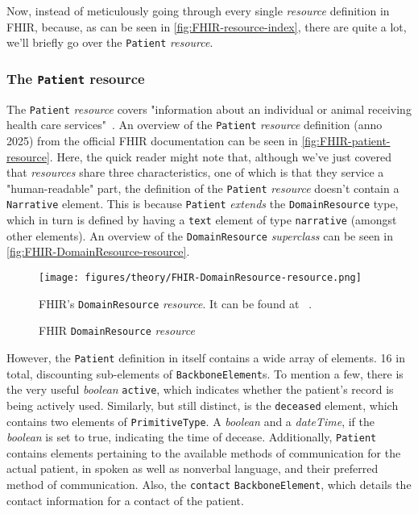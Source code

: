 \noindent
Now, instead of meticulously going through every single \emph{resource} definition in FHIR, because, as can be seen in \autoref{fig:FHIR-resource-index}, there are quite a lot, we'll briefly go over the \texttt{Patient} \emph{resource}.

\subsubsection*{The \texttt{Patient} resource}
The \texttt{Patient} \emph{resource} covers "information about an individual or animal receiving health care services"~\cite{FHIR-patient-resource}. An overview of the \texttt{Patient} \emph{resource} definition (anno 2025) from the official FHIR documentation can be seen in \autoref{fig:FHIR-patient-resource}. Here, the quick reader might note that, although we've just covered that \emph{resources} share three characteristics, one of which is that they service a "human-readable" part, the definition of the \texttt{Patient} \emph{resource} doesn't contain a \texttt{Narrative} element. This is because \texttt{Patient} \emph{extends} the \texttt{DomainResource} type, which in turn is defined by having a \texttt{text} element of type \texttt{narrative} (amongst other elements). An overview of the \texttt{DomainResource} \emph{superclass} can be seen in \autoref{fig:FHIR-DomainResource-resource}.

\begin{figure}[H]
    \centering
    \texttt{[image: figures/theory/FHIR-DomainResource-resource.png]}
    \caption{FHIR \texttt{DomainResource} \emph{resource}}
    \medskip
    \small
    \raggedright
    FHIR's \texttt{DomainResource} \emph{resource}. It can be found at ~\cite{FHIR-DomainResource-resource}.
    \label{fig:FHIR-DomainResource-resource}
\end{figure}

\noindent
However, the \texttt{Patient} definition in itself contains a wide array of elements. 16 in total, discounting sub-elements of \texttt{BackboneElement}s. To mention a few, there is the very useful \emph{boolean} \texttt{active}, which indicates whether the patient's record is being actively used. Similarly, but still distinct, is the \texttt{deceased} element, which contains two elements of \texttt{PrimitiveType}. A \emph{boolean} and a \emph{dateTime}, if the \emph{boolean} is set to true, indicating the time of decease. Additionally, \texttt{Patient} contains elements pertaining to the available methods of communication for the actual patient, in spoken as well as nonverbal language, and their preferred method of communication. Also, the \texttt{contact} \texttt{BackboneElement}, which details the contact information for a contact of the patient. 

